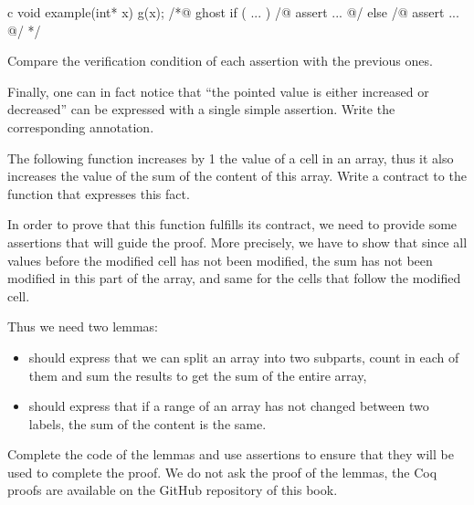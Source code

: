 \begin{CodeBlock}{c}
void example(int* x){
  g(x);
  /*@ ghost
   if ( ... ){
    /@ assert ... @/
   } else {
    /@ assert ... @/
   }
  */
}
\end{CodeBlock}

Compare the verification condition of each assertion with the previous ones.


Finally, one can in fact notice that ``the pointed value is either increased
or decreased'' can be expressed with a single simple assertion. Write the
corresponding annotation.



\label{l4:proof-methodologies-triggering-lemmas-exercises-sum}


The following function increases by 1 the value of a cell in an array, thus it
also increases the value of the sum of the content of this array. Write a
contract to the function that expresses this fact.




In order to prove that this function fulfills its contract, we need to provide
some assertions that will guide the proof. More precisely, we have to show that
since all values before the modified cell has not been modified, the sum has not
been modified in this part of the array, and same for the cells that follow the
modified cell.


Thus we need two lemmas:

\begin{itemize}
\item {} should express that we can split an array into
  two subparts, count in each of them and sum the results to get the sum of the
  entire array,
\item {} should express that if a range of an array has
  not changed between two labels, the sum of the content is the same.
\end{itemize}

Complete the code of the lemmas and use assertions to ensure that they will be
used to complete the proof. We do not ask the proof of the lemmas, the Coq
proofs are available on the GitHub repository of this book.

